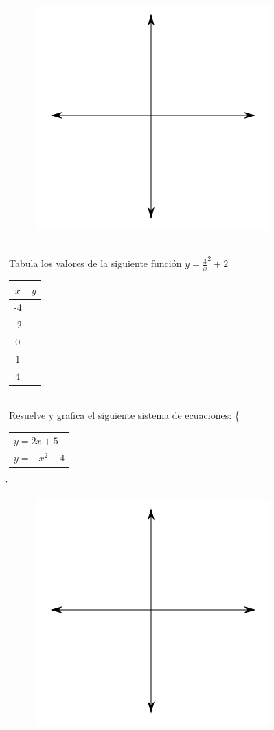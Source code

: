 \documentclass[a4paper,10pt]{article}
\begin{document}
\begin{figure}[H]
\includegraphics[scale=0.5]{plot.png}
\end{figure}
\vspace{0.5cm}\\
\pagebreak
Tabula los valores de la siguiente función  $y=\frac3x^2+2$
\vspace{.5cm}\\
\begin{tabular}{|c|c|}\hline
$x$ & $y$ \\ \hline
 -4   &      \\ \hline
 -2   &      \\ \hline
 0   &       \\ \hline
 1   &       \\ \hline
4   &       \\ \hline
\end{tabular}
\vspace{0.5cm}\\

Resuelve y grafica el siguiente sistema de ecuaciones:
\left\{\begin{tabular}{l}
$y=2x+5$\\
$y=-x^2+4$\\
\end{tabular}\right\.

\begin{figure}[H]
\includegraphics[scale=0.5]{plot.png}
\end{figure}
\vspace{0.5cm}\\
\end{document}
